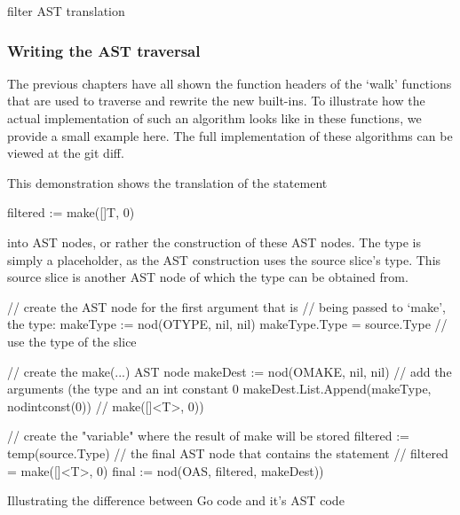 \begin{code}
	\caption{filter AST translation\autocite{filter-walk-implementation}}
\end{code}

\subsubsection{Writing the AST traversal}\label{ch:ast-traversal}

The previous chapters have all shown the function headers of the `walk' functions
that are used to traverse and rewrite the new built-ins. To illustrate how the
actual implementation of such an algorithm looks like in these functions, we
provide a small example here. The full implementation of these algorithms can
be viewed at the git diff\autocite{ba-go1-14-thesis-diff}.

This demonstration shows the translation of the statement
\begin{gocode}
filtered := make([]T, 0)
\end{gocode}
into AST nodes, or rather the construction of these AST nodes.
The type is simply a placeholder, as the AST construction uses the source slice's
type. This source slice is another AST node of which the type can be obtained from.

\begin{listing}
	\begin{gocode}
// create the AST node for the first argument that is
// being passed to `make', the type:
makeType := nod(OTYPE, nil, nil)
makeType.Type = source.Type // use the type of the slice

// create the make(...) AST node
makeDest := nod(OMAKE, nil, nil)
// add the arguments (the type and an int constant 0
makeDest.List.Append(makeType, nodintconst(0)) // make([]<T>, 0))

// create the "variable" where the result of make will be stored
filtered := temp(source.Type)
// the final AST node that contains the statement
//   filtered = make([]<T>, 0)
final := nod(OAS, filtered, makeDest))
\end{gocode}
	\caption{Illustrating the difference between Go code and it's AST code}
\end{listing}
